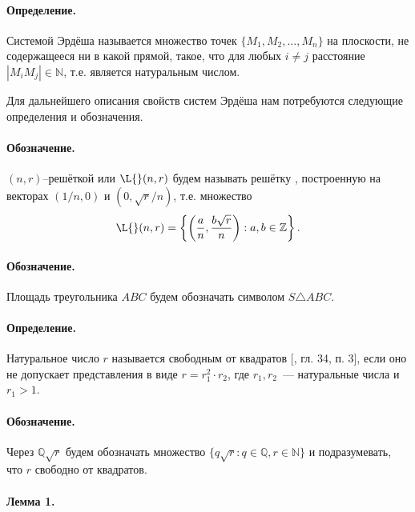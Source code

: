 \documentclass[a4paper,14pt]{article} %
\begin{document}
\renewcommand{\bibname}{Список цитированной литературы}
\renewcommand\refname{\bibname}

\paragraph{Определение.}
Системой Эрдёша называется множество точек $\{M_1, M_2, ..., M_n\}$ на плоскости, не содержащееся ни в какой прямой,
такое, что для любых $i\neq j$ расстояние $|M_i M_j| \in \mathbb{N}$,
т.е. является натуральным числом.

Для дальнейшего описания свойств систем Эрдёша нам потребуются следующие определения и обозначения.

\paragraph{Обозначение.}
$(n,r)$--решёткой или $\L{}(n,r)$ будем называть решётку \cite{polygons-on-lattices}, построенную на векторах $(1/n, 0)$ и $(0, \sqrt{r}/n)$,
т.е. множество
\begin{equation}
	\L{}(n,r) = \left\{
		\left( \frac{a}{n}, \frac{b\sqrt{r}}{n} \right):
		a,b \in \mathbb{Z}
	\right\}.
\end{equation}

\paragraph{Обозначение.}
Площадь треугольника $ABC$ будем обозначать символом $S\triangle ABC$.

\paragraph{Определение.}
Натуральное число $r$ называется свободным от квадратов [\cite{Bukhstab-number-theory}, гл. 34, п. 3], если оно не допускает представления в виде $r = r_1^2 \cdot r_2$,
где $r_1, r_2$~--- натуральные числа и $r_1 > 1$.


\paragraph{Обозначение.}
Через $\mathbb{Q}\sqrt{r}$ будем обозначать множество $\{q\sqrt{r} : q \in \mathbb{Q}, r\in\mathbb{N}\}$
и подразумевать, что $r$ свободно от квадратов.



\paragraph{Лемма 1.}
\end{document}
